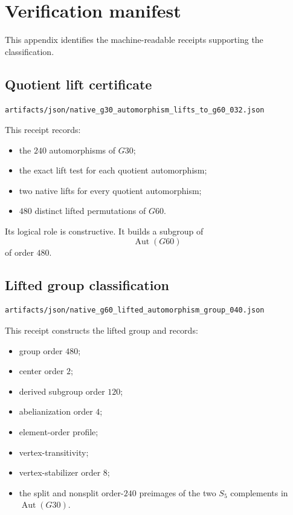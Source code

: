 \section{Verification manifest}
\label{app:verification-manifest}

This appendix identifies the machine-readable receipts supporting the
classification.

\subsection{Quotient lift certificate}

\begin{verbatim}
artifacts/json/native_g30_automorphism_lifts_to_g60_032.json
\end{verbatim}

This receipt records:

\begin{itemize}
\item the $240$ automorphisms of $G30$;
\item the exact lift test for each quotient automorphism;
\item two native lifts for every quotient automorphism;
\item $480$ distinct lifted permutations of $G60$.
\end{itemize}

Its logical role is constructive. It builds a subgroup of
\[
\operatorname{Aut}(G60)
\]
of order $480$.

\subsection{Lifted group classification}

\begin{verbatim}
artifacts/json/native_g60_lifted_automorphism_group_040.json
\end{verbatim}

This receipt constructs the lifted group and records:

\begin{itemize}
\item group order $480$;
\item center order $2$;
\item derived subgroup order $120$;
\item abelianization order $4$;
\item element-order profile;
\item vertex-transitivity;
\item vertex-stabilizer order $8$;
\item the split and nonsplit order-$240$ preimages of the two
$S_5$ complements in $\operatorname{Aut}(G30)$.
\end{itemize}

